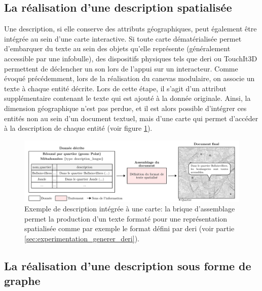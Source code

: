 \subsection{La réalisation d'une description spatialisée}

\label{sec:description_carte}

Une description, si elle conserve des attributs géographiques, peut également être intégrée au sein d'une carte interactive. Si toute carte dématérialisée permet d'embarquer du texte au sein des objets qu'elle représente (généralement accessible par une infobulle), des dispositifs physiques tels que \gls{deri} \citep{Brock2012} ou TouchIt3D \citep{barvir2021} permettent de déclencher un son lors de l'appui sur un interacteur. Comme évoqué précédemment, lors de la réalisation du canevas modulaire, on associe un texte à chaque entité décrite. Lors de cette étape, il s'agit d'un attribut supplémentaire contenant le texte qui est ajouté à la donnée originale. Ainsi, la dimension géographique n'est pas perdue, et il est alors possible d'intégrer ces entités non au sein d'un document textuel, mais d'une carte qui permet d'accéder à la description de chaque entité (voir figure \ref{fig:desc_ex_desc_spatialisee}).

\begin{figure}[ht]
    \centering
    \includegraphics[width=\textwidth]{images/description/exemple_desc_spatialise.pdf
    }
    \caption[Exemple de description spatialisée.]{Exemple de description intégrée à une carte: la brique d'assemblage permet la production d'un texte formaté pour une représentation spatialisée comme par exemple le format défini par \gls{deri} (voir partie \ref{sec:experimentation_generer_deri}).}
    \label{fig:desc_ex_desc_spatialisee}
\end{figure}

\subsection{La réalisation d'une description sous forme de graphe}

\label{sec:description_graphe}


